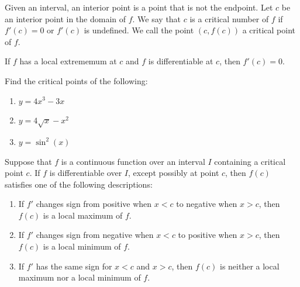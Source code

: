 \documentclass[12pt]{amsart}
\begin{document}
\begin{definition}
	Given an interval, an interior point is a point that is  not the endpoint.
	Let  $c$ be an interior point in the domain of  $f$.
	We say that \( c \) is a critical number of \( f \) if \( f'(c) = 0 \) or \( f'(c) \) is undefined.
	We call the point \( (c, f(c)) \) a critical point of \( f \).
\end{definition}

\begin{theorem}
	If $f$ has a local extrememum at $c$ and $f$ is differentiable at $c$, then $f'(c) = 0$.
\end{theorem}

\begin{question}
	Find the critical points of the following:
	\begin{enumerate}
		\item $ y = 4x^3 - 3x$

		      \vspace{5cm}

		\item $ y = 4 \sqrt{x} - x^2$

		      \vspace{5cm}

		\item $y = \sin^2(x)$
		      \vspace{5cm}
	\end{enumerate}
\end{question}



\begin{theorem}
	Suppose that $f$ is a continuous function over an interval $I$ containing a critical point \( c \). If \( f \) is differentiable over \( I \), except possibly at point \( c \), then \( f(c) \) satisfies one of the following descriptions:

	\begin{enumerate}
		\item If \( f' \) changes sign from positive when \( x < c \) to negative when \( x > c \), then \( f(c) \) is a local maximum of \( f \).
		\item If \( f' \) changes sign from negative when \( x < c \) to positive when \( x > c \), then \( f(c) \) is a local minimum of \( f \).
		\item If \( f' \) has the same sign for \( x < c \) and \( x > c \), then \( f(c) \) is neither a local maximum nor a local minimum of \( f \).
	\end{enumerate}
\end{theorem}
\end{document}
